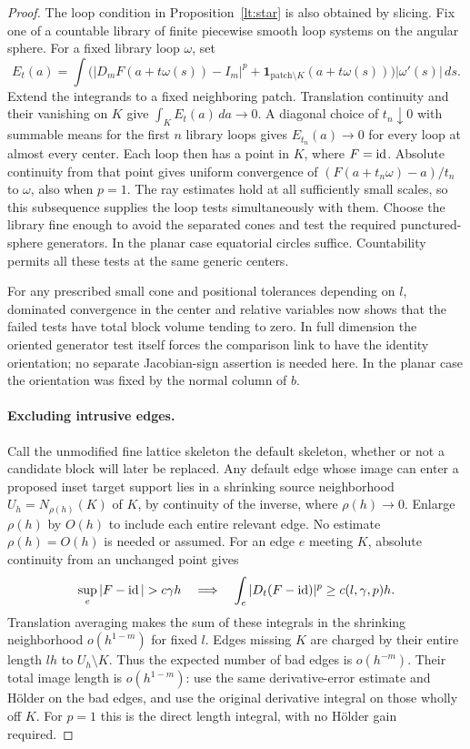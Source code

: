 \begin{proof}
The loop condition in Proposition~\ref{lt:star} is also obtained by slicing.
Fix one of a countable library of finite piecewise smooth loop
systems on the angular sphere.  For a fixed library loop $\omega$, set
\[
 E_t(a)=\int\bigl(|D_mF(a+t\omega(s))-I_m|^p
       +\mathbf1_{\text{patch}\setminus K}(a+t\omega(s))\bigr)
                         |\omega'(s)|\,ds.
\]
Extend the integrands to a fixed neighboring patch.  Translation
continuity and their vanishing on $K$ give
$\int_K E_t(a)\,da\to0$.  A diagonal choice of $t_n\downarrow0$
with summable means for the first $n$ library loops gives
$E_{t_n}(a)\to0$ for every loop at almost every center.  Each loop
then has a point in $K$, where $F=\operatorname{id}$.  Absolute continuity from
that point gives uniform convergence of
$(F(a+t_n\omega)-a)/t_n$ to $\omega$, also when $p=1$.
The ray estimates hold at all sufficiently small scales, so this
subsequence supplies the loop tests simultaneously with them.
Choose the library fine enough to avoid the separated cones and test
the required punctured-sphere generators.  In the planar case
equatorial circles suffice.  Countability permits all these tests at
the same generic centers.

For any prescribed small cone and positional tolerances depending on
$l$, dominated convergence in the center and relative variables now
shows that the failed tests have total block volume tending to zero.
In full dimension the oriented generator test itself forces the
comparison link to have the identity orientation; no separate
Jacobian-sign assertion is needed here.  In the planar case the
orientation was fixed by the normal column of $b$.

\paragraph{Excluding intrusive edges.}
Call the unmodified fine lattice skeleton the default skeleton,
whether or not a candidate block will later be replaced.  Any default
edge whose image can enter a proposed inset target support lies in a
shrinking source neighborhood $U_h=N_{\rho(h)}(K)$ of $K$, by
continuity of the inverse, where $\rho(h)\to0$.  Enlarge $\rho(h)$
by $O(h)$ to include each entire relevant edge.  No estimate
$\rho(h)=O(h)$ is needed or assumed.
For an edge $e$ meeting $K$, absolute continuity from an unchanged
point gives
\[
 \sup_e|F-\Id|>c\gamma h
 \quad\Longrightarrow\quad
 \int_e|D_t(F-\Id)|^p\ge c(l,\gamma,p)h.
\]
Translation averaging makes the sum of these integrals in the
shrinking neighborhood $o(h^{1-m})$ for fixed $l$.  Edges missing $K$
are charged by their entire length $lh$ to
$U_h\setminus K$.  Thus the expected number of bad edges is
$o(h^{-m})$.  Their total image length is $o(h^{1-m})$: use the same
derivative-error estimate and H\"older on the bad edges, and use the
original derivative integral on those wholly off $K$.  For $p=1$
this is the direct length integral, with no H\"older gain required.


\end{proof}
